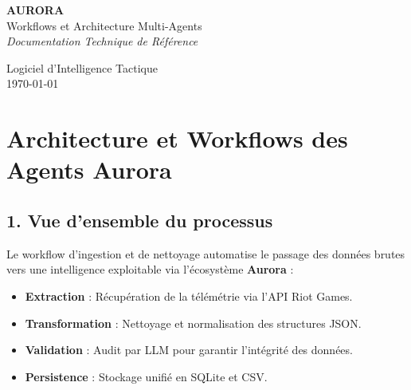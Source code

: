 \documentclass[11pt,a4paper]{article}
\begin{document}
\begin{titlepage}
    \centering
    \vspace*{3cm}
    \begin{tcolorbox}[
        enhanced,
        colback=darkNavy,
        colframe=valorantRed,
        boxrule=3pt,
        arc=10pt,
        width=0.9\textwidth,
        drop shadow={opacity=0.3}
    ]
        \centering
        \vspace{0.5cm}
        {\Huge\bfseries\color{white} AURORA}\\[0.4cm]
        {\LARGE\color{offWhite} Workflows et Architecture Multi-Agents}\\[0.3cm]
        {\large\itshape\color{valorantRed} Documentation Technique de Référence}
        \vspace{0.5cm}
    \end{tcolorbox}
    \vspace{2cm}
    {\large \faRobot \quad Logiciel d'Intelligence Tactique} \\
    \vspace{1cm}
    \vfill
    {\large \today}
\end{titlepage}

\newpage

\section{Architecture et Workflows des Agents Aurora}

\subsection{1. Vue d'ensemble du processus}

Le workflow d'ingestion et de nettoyage automatise le passage des données brutes vers une intelligence exploitable via l'écosystème \textbf{Aurora} :

\begin{itemize}[label=\color{valorantRed}\faCogs, leftmargin=1cm]
    \item \textbf{Extraction} : Récupération de la télémétrie via l'API Riot Games.
    \item \textbf{Transformation} : Nettoyage et normalisation des structures JSON.
    \item \textbf{Validation} : Audit par LLM pour garantir l'intégrité des données.
    \item \textbf{Persistence} : Stockage unifié en SQLite et CSV.
\end{itemize}
\end{document}
